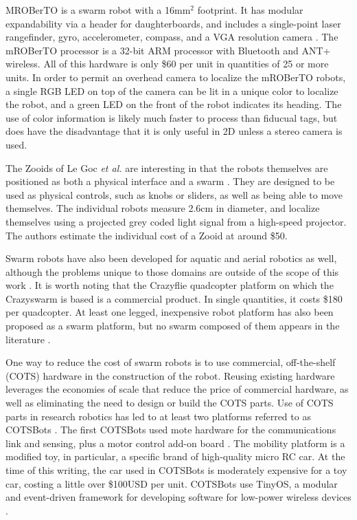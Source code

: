 MROBerTO is a swarm robot with a 16mm$^2$ footprint. It has modular expandability via a header for daughterboards, and includes a single-point laser rangefinder, gyro, accelerometer, compass, and a VGA resolution camera \citep{Kim2016mROBerTOAM}. 
The mROBerTO processor is a 32-bit ARM processor with Bluetooth and ANT+ wireless. 
All of this hardware is only \$60 per unit in quantities of 25 or more units. 
In order to permit an overhead camera to localize the mROBerTO robots, a single RGB LED on top of the camera can be lit in a unique color to localize the robot, and a green LED on the front of the robot indicates its heading. 
The use of color information is likely much faster to process than fiducual tags, but does have the disadvantage that it is only useful in 2D unless a stereo camera is used. 

The Zooids of Le Goc \emph{et al.} are interesting in that the robots themselves are positioned as both a physical interface and a swarm \citep{le2016zooids}. 
They are designed to be used as physical controls, such as knobs or sliders, as well as being able to move themselves.
The individual robots measure 2.6cm in diameter, and localize themselves using a projected grey coded light signal from a high-speed projector. 
The authors estimate the individual cost of a Zooid at around \$50. 

Swarm robots have also been developed for aquatic and aerial robotics as well, although the problems unique to those domains are outside of the scope of this work \citep{costa2016design, preiss2017crazyswarm}. 
It is worth noting that the Crazyflie quadcopter platform on which the Crazyswarm is based is a commercial product. 
In single quantities, it costs \$180 per quadcopter. 
At least one legged, inexpensive robot platform has also been proposed as a swarm platform, but no swarm composed of them appears in the literature \citep{kalat2015tribot}. 

One way to reduce the cost of swarm robots is to use commercial, off-the-shelf (COTS) hardware in the construction of the robot. 
Reusing existing hardware leverages the economies of scale that reduce the price of commercial hardware, as well as eliminating the need to design or build the COTS parts. 
Use of COTS parts in research robotics has led to at least two platforms referred to as COTSBots \citep{bergbreiter2003cotsbots, soule2011cotsbots}.
The first COTSBots used mote hardware for the communications link and sensing, plus a motor control add-on board \citep{bergbreiter2003cotsbots}. 
The mobility platform is a modified toy, in particular, a specific brand of high-quality micro RC car.
At the time of this writing, the car used in COTSBots is moderately expensive for a toy car, costing a little over \$100USD per unit. 
COTSBots use TinyOS, a modular and event-driven framework for developing software for low-power wireless devices \citep{levis2005tinyos}. 


